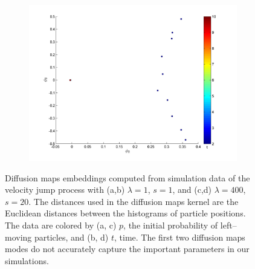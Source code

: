 \documentclass[prl,reprint]{revtex4-1}
\begin{document}
\begin{figure}[htb]
\begin{subfigure}{0.2\textwidth}
\caption{}
\end{subfigure}
\begin{subfigure}{0.2\textwidth}
\includegraphics[width=\textwidth]{rawhist_t_400}
\caption{}
\end{subfigure}
\caption{Diffusion maps embeddings computed from simulation data of the velocity jump process with (a,b) $\lambda=1$, $s=1$, and (c,d) $\lambda=400$, $s=20$. The distances used in the diffusion maps kernel are the Euclidean distances between the histograms of particle positions. The data are colored by (a, c) $p$, the initial probability of left--moving particles, and (b, d) $t$, time. The first two diffusion maps modes do not accurately capture the important parameters in our simulations.}
\label{fig:dmaps_embed_noemd}
\end{figure}
\end{document}
